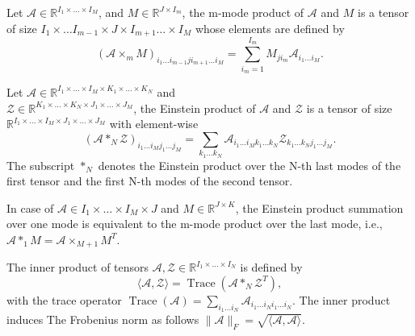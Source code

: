 \documentclass{siamltex}
\begin{document}
\begin{definition}\cite{Kolda2009}%
Let $\mathcal{A} \in \mathbb{R}^{I_1 \times \ldots \times I_M}$, and $M \in \mathbb{R}^{J\times I_m}$, the m-mode product of $\mathcal{A}$ and $M$ is a tensor of size $I_1 \times \ldots I_{m-1} \times J \times I_{m+1} \ldots \times I_M$ whose elements are defined by
\begin{equation}
(\mathcal{A} \times_m M)_{i_1 \ldots i_{m-1}ji_{m+1} \ldots i_M}=\sum_{i_m=1}^{I_m} M_{j i_m} \mathcal{A}_{i_1 \ldots i_M}.
\end{equation}
\end{definition}
\begin{definition}\cite{Brazell2013}%
Let $\mathcal{A} \in \mathbb{R}^{I_1 \times \ldots \times I_M \times K_1 \times \ldots \times K_N}$ and \\ $\mathcal{Z} \in \mathbb{R}^{K_1 \times \ldots \times K_N \times J_1 \times \ldots \times J_M}$, the Einstein product of $\mathcal{A}$ and $\mathcal{Z}$ is a tensor of size $\mathbb{R}^{I_1 \times \ldots \times I_M \times J_1 \times \ldots \times J_M}$ with element-wise
\begin{equation}
\left(\mathcal{A} *_N \mathcal{Z}\right)_{i_1 \ldots i_M j_1 \ldots j_M}=\sum_{k_1 \ldots k_N} \mathcal{A}_{i_1 \ldots i_M k_1 \ldots k_N} \mathcal{Z}_{k_1 \ldots k_N j_1 \ldots j_M}.
\end{equation}
The subscript $*_N$ denotes the Einstein product over the N-th last modes of the first tensor and the first N-th modes of the second tensor.
\end{definition}
In case of $\mathcal{A} \in {I_1 \times \ldots \times I_M \times J}$ and $M \in \mathbb{R}^{J \times K}$, the Einstein product summation over one mode is equivalent to the m-mode product over the last mode, i.e., $\mathcal{A} *_1 M=\mathcal{A} \times_{M+1}M^T$.\\
\begin{definition}
The inner product of tensors $\mathcal{A}, \mathcal{Z} \in \mathbb{R}^{I_1 \times \ldots \times I_N}$ is defined by 
$$\langle \mathcal{A}, \mathcal{Z}\rangle=\operatorname{Trace} (\mathcal{A} *_N \mathcal{Z}^T),$$
with the trace operator $\operatorname{Trace}(\mathcal{A})=\sum_{i_1 \ldots i_N} \mathcal{A}_{i_1 \ldots i_N i_1 \ldots i_N}$.
The inner product induces The Frobenius norm as follows
$\|\mathcal{A}\|_{F}=\sqrt{\langle \mathcal{A}, \mathcal{A}\rangle}.$
\end{definition}
\end{document}
